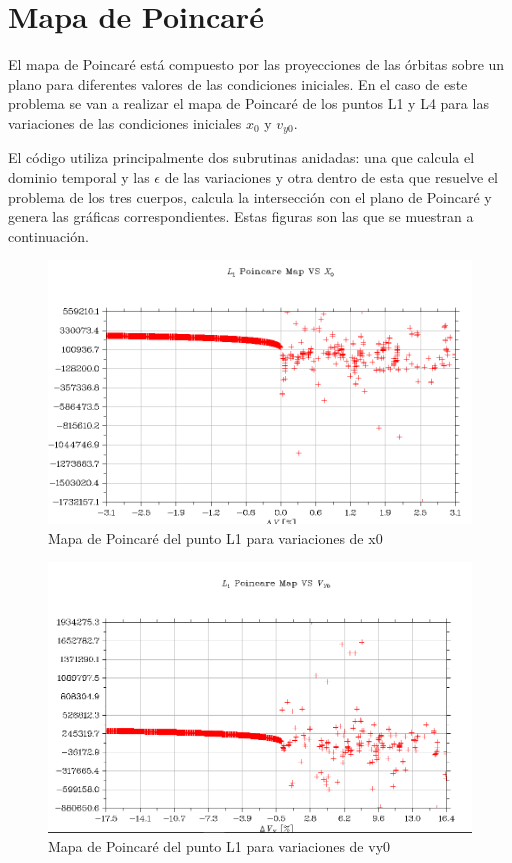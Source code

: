 \documentclass{article}
\begin{document}
	\newpage
	
	\section{Mapa de Poincaré}
	
	El mapa de Poincaré está compuesto por las proyecciones de las órbitas sobre un plano para diferentes valores de las condiciones iniciales. En el caso de este problema se van a realizar el mapa de Poincaré de los puntos L1 y L4 para las variaciones de las condiciones iniciales $x_0$ y $v_{y0}$.
	
	El código utiliza principalmente dos subrutinas anidadas: una que calcula el dominio temporal y las $\epsilon$ de las variaciones y otra dentro de esta que resuelve el problema de los tres cuerpos, calcula la intersección con el plano de Poincaré y genera las gráficas correspondientes. Estas figuras son las que se muestran a continuación.
	
	\begin{figure}[h!]
		\begin{center}
			\includegraphics[scale=0.45]{p1.png}
			\caption{Mapa de Poincaré del punto L1 para variaciones de x0}
		\end{center}
	\end{figure}

	\begin{figure}[h!]
		\begin{center}
			\includegraphics[scale=0.45]{p2.png}
			\caption{Mapa de Poincaré del punto L1 para variaciones de vy0}
		\end{center}
	\end{figure}
\end{document}

